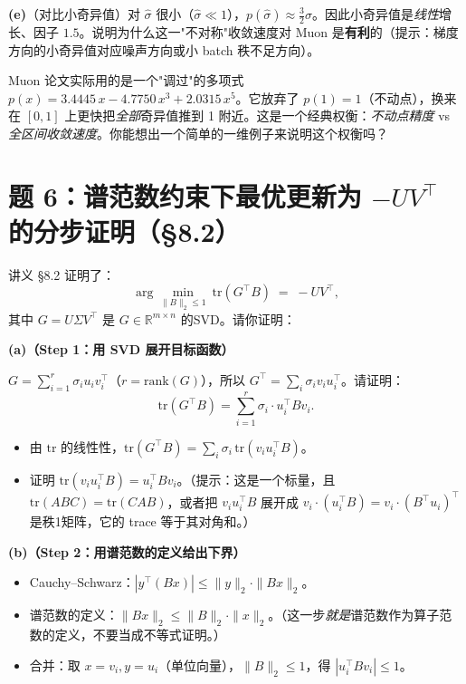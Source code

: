 \documentclass[12pt,a4paper]{article}
\begin{document}
\textbf{(e)}（对比小奇异值）对 $\hat\sigma$ 很小（$\hat\sigma \ll 1$），$p(\hat\sigma) \approx \tfrac{3}{2}\hat\sigma$。因此小奇异值是\emph{线性}增长、因子 $1.5$。说明为什么这一"不对称"收敛速度对 Muon 是\textbf{有利}的（提示：梯度方向的小奇异值对应噪声方向或小 batch 秩不足方向）。

\begin{thinkbox}
Muon 论文实际用的是一个"调过"的多项式 $p(x) = 3.4445\, x - 4.7750\, x^3 + 2.0315\, x^5$。它放弃了 $p(1) = 1$（不动点），换来在 $[0, 1]$ 上更快把\emph{全部}奇异值推到 1 附近。这是一个经典权衡：\emph{不动点精度} vs \emph{全区间收敛速度}。你能想出一个简单的一维例子来说明这个权衡吗？
\end{thinkbox}

\section*{题 6：谱范数约束下最优更新为 $-UV^\top$ 的分步证明（§8.2）}

讲义 §8.2 证明了：
\[
\arg\min_{\|B\|_2 \le 1}\ \mathrm{tr}(G^\top B) \;=\; -U V^\top,
\]
其中 $G = U\Sigma V^\top$ 是 $G \in \mathbb{R}^{m \times n}$ 的SVD。请你证明：

\textbf{(a)（Step 1：用 SVD 展开目标函数）}

$G = \sum_{i=1}^r \sigma_i u_i v_i^\top$（$r = \mathrm{rank}(G)$），所以 $G^\top = \sum_i \sigma_i v_i u_i^\top$。请证明：
\[
\mathrm{tr}(G^\top B) = \sum_{i=1}^r \sigma_i \cdot u_i^\top B v_i.
\]
\begin{itemize}[leftmargin=*,nosep]
  \item[(a1)] 由 $\mathrm{tr}$ 的线性性，$\mathrm{tr}(G^\top B) = \sum_i \sigma_i\, \mathrm{tr}(v_i u_i^\top B)$。
  \item[(a2)] 证明 $\mathrm{tr}(v_i u_i^\top B) = u_i^\top B v_i$。（提示：这是一个标量，且 $\mathrm{tr}(ABC) = \mathrm{tr}(CAB)$，或者把 $v_i u_i^\top B$ 展开成 $v_i \cdot (u_i^\top B) = v_i \cdot (B^\top u_i)^\top$ 是秩1矩阵，它的 trace 等于其对角和。）
\end{itemize}

\textbf{(b)（Step 2：用谱范数的定义给出下界）}

\begin{itemize}[leftmargin=*,nosep]
  \item[(b1)] Cauchy–Schwarz：$|y^\top (Bx)| \le \|y\|_2 \cdot \|Bx\|_2$。
  \item[(b2)] 谱范数的定义：$\|Bx\|_2 \le \|B\|_2 \cdot \|x\|_2$。（这一步\emph{就是}谱范数作为算子范数的定义，不要当成不等式证明。）
  \item[(b3)] 合并：取 $x = v_i, y = u_i$（单位向量），$\|B\|_2 \le 1$，得 $|u_i^\top B v_i| \le 1$。
\end{itemize}
\end{document}
